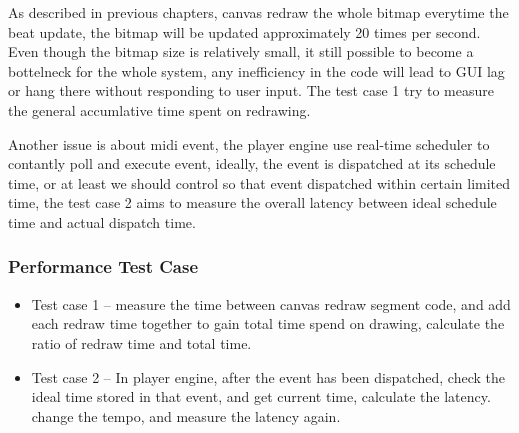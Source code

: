 As described in previous chapters, canvas redraw the whole bitmap everytime 
the beat update, the bitmap will be updated approximately 20 times per second.
Even though the bitmap size is relatively small, it still possible to become a bottelneck
for the whole system, any inefficiency in the code will lead to GUI lag or hang there
without responding to user input. The test case 1 try to measure the general 
accumlative time spent on redrawing. 

Another issue is about midi event, the player engine use real-time scheduler to  
contantly poll and execute event, ideally, the event is dispatched at its 
schedule time, or at least we should control so that event dispatched within 
certain limited time, the test case 2 aims to measure the overall latency between 
ideal schedule time and actual dispatch time. 
\subsubsection{Performance Test Case}
\begin{itemize}
  \item Test case 1 -- measure the time between canvas redraw segment code, and add 
        each redraw time together to gain total time spend on drawing, calculate the 
        ratio of redraw time and total time.
  \item Test case 2 -- In player engine, after the event has been dispatched, 
        check the ideal time stored in that event, and get current time, calculate 
        the latency. change the tempo, and measure the latency again.
\end{itemize}
